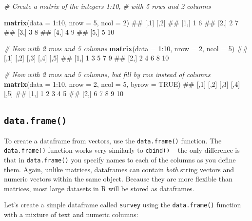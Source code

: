 \documentclass[]{book}
\newenvironment{Shaded}{\begin{snugshade}}{\end{snugshade}}
\newcommand{\KeywordTok}[1]{\textcolor[rgb]{0.13,0.29,0.53}{\textbf{{#1}}}}
\newcommand{\DataTypeTok}[1]{\textcolor[rgb]{0.13,0.29,0.53}{{#1}}}
\newcommand{\DecValTok}[1]{\textcolor[rgb]{0.00,0.00,0.81}{{#1}}}
\newcommand{\CommentTok}[1]{\textcolor[rgb]{0.56,0.35,0.01}{\textit{{#1}}}}
\newcommand{\OtherTok}[1]{\textcolor[rgb]{0.56,0.35,0.01}{{#1}}}
\newcommand{\NormalTok}[1]{{#1}}
\theoremstyle{definition}
\theoremstyle{definition}
\theoremstyle{remark}
\begin{document}
\begin{Shaded}
\begin{Highlighting}[]
\CommentTok{# Create a matrix of the integers 1:10,}
\CommentTok{#  with 5 rows and 2 columns}

\KeywordTok{matrix}\NormalTok{(}\DataTypeTok{data =} \DecValTok{1}\NormalTok{:}\DecValTok{10}\NormalTok{,}
       \DataTypeTok{nrow =} \DecValTok{5}\NormalTok{,}
       \DataTypeTok{ncol =} \DecValTok{2}\NormalTok{)}
\NormalTok{##      [,1] [,2]}
\NormalTok{## [1,]    1    6}
\NormalTok{## [2,]    2    7}
\NormalTok{## [3,]    3    8}
\NormalTok{## [4,]    4    9}
\NormalTok{## [5,]    5   10}

\CommentTok{# Now with 2 rows and 5 columns}
\KeywordTok{matrix}\NormalTok{(}\DataTypeTok{data =} \DecValTok{1}\NormalTok{:}\DecValTok{10}\NormalTok{,}
       \DataTypeTok{nrow =} \DecValTok{2}\NormalTok{,}
       \DataTypeTok{ncol =} \DecValTok{5}\NormalTok{)}
\NormalTok{##      [,1] [,2] [,3] [,4] [,5]}
\NormalTok{## [1,]    1    3    5    7    9}
\NormalTok{## [2,]    2    4    6    8   10}

\CommentTok{# Now with 2 rows and 5 columns, but fill by row instead of columns}
\KeywordTok{matrix}\NormalTok{(}\DataTypeTok{data =} \DecValTok{1}\NormalTok{:}\DecValTok{10}\NormalTok{,}
       \DataTypeTok{nrow =} \DecValTok{2}\NormalTok{,}
       \DataTypeTok{ncol =} \DecValTok{5}\NormalTok{,}
       \DataTypeTok{byrow =} \OtherTok{TRUE}\NormalTok{)}
\NormalTok{##      [,1] [,2] [,3] [,4] [,5]}
\NormalTok{## [1,]    1    2    3    4    5}
\NormalTok{## [2,]    6    7    8    9   10}
\end{Highlighting}
\end{Shaded}

\subsection{\texorpdfstring{\texttt{data.frame()}}{data.frame()}}\label{data.frame}

To create a dataframe from vectors, use the \texttt{data.frame()}
function. The \texttt{data.frame()} function works very similarly to
\texttt{cbind()} -- the only difference is that in \texttt{data.frame()}
you specify names to each of the columns as you define them. Again,
unlike matrices, dataframes can contain \emph{both} string vectors and
numeric vectors within the same object. Because they are more flexible
than matrices, most large datasets in R will be stored as dataframes.

Let's create a simple dataframe called \texttt{survey} using the
\texttt{data.frame()} function with a mixture of text and numeric
columns:
\end{document}
